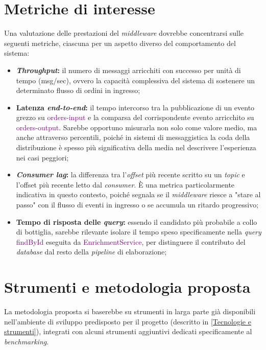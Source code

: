 \section{Metriche di interesse}
\label{Metriche di interesse}
Una valutazione delle prestazioni del \textit{middleware} dovrebbe concentrarsi sulle seguenti metriche, ciascuna per un aspetto diverso del comportamento del sistema:
\begin{itemize}
    \item \textbf{\textit{\gls{Throughput}}:} il numero di messaggi arricchiti con successo per unità di tempo (msg/sec), ovvero la capacità complessiva del sistema di sostenere un determinato flusso di ordini in ingresso;
    \item \textbf{Latenza \textit{end-to-end}:} il tempo intercorso tra la pubblicazione di un evento grezzo su \textcolor{purple}{orders-input} e la comparsa del corrispondente evento arricchito su \textcolor{purple}{orders-output}. Sarebbe opportuno misurarla non solo come valore medio, ma anche attraverso percentili, poiché in sistemi di messaggistica la coda della distribuzione è spesso più significativa della media nel descrivere l'esperienza nei casi peggiori;
    \item \textbf{\textit{Consumer lag}:} la differenza tra l'\textit{offset} più recente scritto su un \textit{topic} e l'offset più recente letto dal \textit{consumer}. È una metrica particolarmente indicativa in questo contesto, poiché segnala se il \textit{middleware} riesce a "stare al passo" con il flusso di eventi in ingresso o se accumula un ritardo progressivo;
    \item \textbf{Tempo di risposta delle \textit{query}:} essendo il candidato più probabile a collo di bottiglia, sarebbe rilevante isolare il tempo speso specificamente nella \textit{query} \textcolor{purple}{findById} eseguita da \textcolor{purple}{EnrichmentService}, per distinguere il contributo del \textit{database} dal resto della \textit{pipeline} di elaborazione;
\end{itemize}

\section{Strumenti e metodologia proposta}
La metodologia proposta si baserebbe su strumenti in larga parte già disponibili nell'ambiente di sviluppo predisposto per il progetto (descritto in \ref{Tecnologie e strumenti}), integrati con alcuni strumenti aggiuntivi dedicati specificamente al \textit{benchmarking}.

